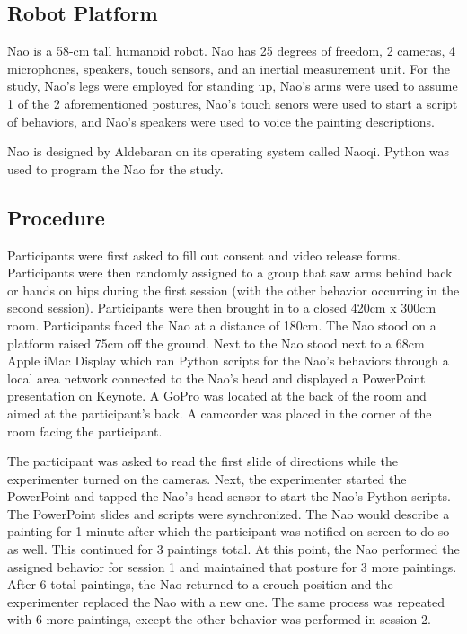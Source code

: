 \documentclass{acm_proc_article-sp}
\begin{document}
\subsection{Robot Platform}
Nao is a 58-cm tall humanoid robot. Nao has 25 degrees of freedom, 2 cameras, 4 microphones, speakers, touch sensors, and an inertial measurement unit. For the study, Nao's legs were employed for standing up, Nao's arms were used to assume 1 of the 2 aforementioned postures, Nao's touch senors were used to start a script of behaviors, and Nao's speakers were used to voice the painting descriptions. 

Nao is designed by Aldebaran on its operating system called Naoqi. Python was used to program the Nao for the study. 

\subsection{Procedure}
Participants were first asked to fill out consent and video release forms. Participants were then randomly assigned to a group that saw arms behind back or hands on hips during the first session (with the other behavior occurring in the second session). Participants were then brought in to a closed 420cm x 300cm room. Participants faced the Nao at a distance of 180cm. The Nao stood on a platform raised 75cm off the ground. Next to the Nao stood next to a 68cm Apple iMac Display which ran Python scripts for the Nao's behaviors through a local area network connected to the Nao's head and displayed a PowerPoint presentation on Keynote. A GoPro was located at the back of the room and aimed at the participant's back. A camcorder was placed in the corner of the room facing the participant.

The participant was asked to read the first slide of directions while the experimenter turned on the cameras. Next, the experimenter started the PowerPoint and tapped the Nao's head sensor to start the Nao's Python scripts. The PowerPoint slides and scripts were synchronized. The Nao would describe a painting for 1 minute after which the participant was notified on-screen to do so as well. This continued for 3 paintings total. At this point, the Nao performed the assigned behavior for session 1 and maintained that posture for 3 more paintings. After 6 total paintings, the Nao returned to a crouch position and the experimenter replaced the Nao with a new one. The same process was repeated with 6 more paintings, except the other behavior was performed in session 2. 
\end{document}
